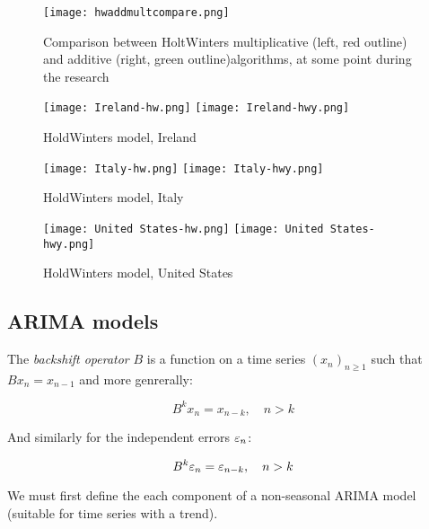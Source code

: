 \begin{figure}[H]
\texttt{[image: hwaddmultcompare.png]}
\caption{Comparison between HoltWinters multiplicative (left, red outline) and additive (right, green outline)algorithms, at some point during the research}
\end{figure}

\begin{figure}[H]
  \texttt{[image: Ireland-hw.png]} \label{fig:ireland-hw}
\endminipage\hfill
{}
  \texttt{[image: Ireland-hwy.png]} \label{fig:ireland-hwy}
\endminipage
\caption{HoldWinters model, Ireland}
\end{figure}

\begin{figure}[H]
  \texttt{[image: Italy-hw.png]} \label{fig:italy-hw}
\endminipage\hfill
{}
  \texttt{[image: Italy-hwy.png]} \label{fig:italy-hwy}
\endminipage
\caption{HoldWinters model, Italy}
\end{figure}

\begin{figure}[H]
  \texttt{[image: United States-hw.png]} \label{fig:usa-hw}
\endminipage\hfill
{}
  \texttt{[image: United States-hwy.png]} \label{fig:usa-hwy}
\endminipage
\caption{HoldWinters model, United States}
\end{figure}


\subsection{ARIMA models}

\begin{definition}
The \textit{backshift operator} $B$ is a function on a time series $\left(x_n\right)_{n\geq1}$ such that $Bx_n=x_{n-1}$ and more genrerally:

$$B^k x_n= x_{n-k},\quad n>k$$

And similarly for the independent errors $\varepsilon_n$:

$$B^k \varepsilon_n= \varepsilon_{n-k},\quad n>k$$
\end{definition}

We must first define the each component of a non-seasonal ARIMA model (suitable for time series with a trend).

